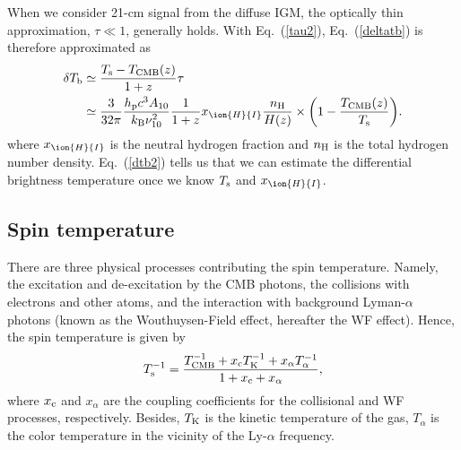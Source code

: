 \documentclass[a4paper,fleqn,usenatbib,useAMS]{mnras}
\begin{document}
When we consider  21-cm signal from the diffuse IGM, the
optically thin approximation, $\tau \ll 1$, generally holds. 
With Eq.~(\ref{tau2}), Eq.~(\ref{deltatb}) is therefore approximated as 
\begin{align}
	\delta T_{\rm b}&\simeq \frac{T_{\rm{s}}-T_{\rm{CMB}}(z)}{1+z}\tau \nonumber \\
	& \simeq\frac{3}{32\pi}\frac{h_{\rm{p}}c^{3}A_{10}}{k_{\rm{B}}\nu_{10}^{2}}\frac{1}{1+z}	
	x_{\ion{H}{I}} \frac{n_{\rm{H}}}{H(z)} \times \biggl( 1-\frac{T_{\rm{CMB}}(z)}{T_{\rm{s}}} \biggl).
	\label{dtb2}
\end{align}
where $x_{\ion{H}{I}}$ is the neutral hydrogen fraction and $n_{\rm{H}}$ is the total hydrogen number density. 
Eq.~(\ref{dtb2}) tells us that we can estimate the differential
brightness temperature
once we know
$T_{\rm s}$ and $x_{\ion{H}{I}}$. 

\subsection{Spin temperature}\label{Spin temperature}
There are three physical processes contributing the spin temperature. 
Namely, the excitation and de-excitation by the CMB photons, the
collisions with electrons and other atoms, and the interaction with
background Lyman-$\alpha$ photons (known as the Wouthuysen-Field effect, hereafter the WF effect). 
Hence, the spin temperature is given by~\citep{1959ApJ...129..536F}
\begin{align}
	T_{\rm s}^{-1}=\frac{T_{\rm{CMB}}^{-1}+x_{\rm c}T_{\rm{K}}^{-1}+x_{\alpha}
	T_{\alpha}	^{-1}}{1+x_{\rm c}+x_{\alpha}} , \label{spin}
\end{align}
where $x_{\rm c}$ and $x_{\alpha}$ are the coupling coefficients for the collisional and WF processes, respectively. 
Besides, $T_{\rm{K}}$ is the kinetic temperature of the gas,
$T_{\alpha}$ is the color temperature in the vicinity of the Ly-$\alpha$ frequency.
\end{document}
